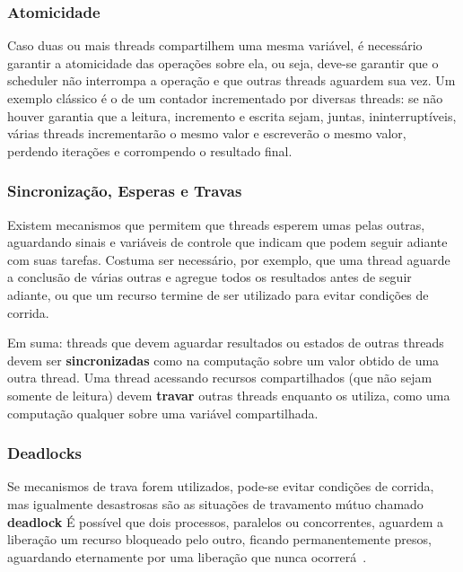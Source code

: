 \documentclass{article}
\begin{document}
\subsubsection{Atomicidade}
\label{sssec:atomicidade e secoes criticas}

Caso duas ou mais threads compartilhem uma mesma variável, é necessário garantir a atomicidade das operações sobre ela, ou seja, deve-se garantir que o scheduler não interrompa a operação e que outras threads aguardem sua vez. Um exemplo clássico é o de um contador incrementado por diversas threads: se não houver garantia que a leitura, incremento e escrita sejam, juntas, ininterruptíveis, várias threads incrementarão o mesmo valor e escreverão o mesmo valor, perdendo iterações e corrompendo o resultado final.

\subsubsection{Sincronização, Esperas e Travas}
\label{sssec:sincronizacao esperas e travas}

Existem mecanismos que permitem que threads esperem umas pelas outras, aguardando sinais e variáveis de controle que indicam que podem seguir adiante com suas tarefas. Costuma ser necessário, por exemplo, que uma thread aguarde a conclusão de várias outras e agregue todos os resultados antes de seguir adiante, ou que um recurso termine de ser utilizado para evitar condições de corrida.

Em suma: threads que devem aguardar resultados ou estados de outras threads devem ser \textbf{sincronizadas} como na computação sobre um valor obtido de uma outra thread. Uma thread acessando recursos compartilhados (que não sejam somente de leitura) devem \textbf{travar} outras threads enquanto os utiliza, como uma computação qualquer sobre uma variável compartilhada.

\subsubsection{Deadlocks}
\label{sssec:deadlock}

Se mecanismos de trava forem utilizados, pode-se evitar condições de corrida, mas igualmente desastrosas são as situações de travamento mútuo chamado \textbf{deadlock} É possível que dois processos, paralelos ou concorrentes, aguardem a liberação um recurso bloqueado pelo outro, ficando permanentemente presos, aguardando eternamente por uma liberação que nunca ocorrerá~\cite{pacheco11}.
\end{document}
